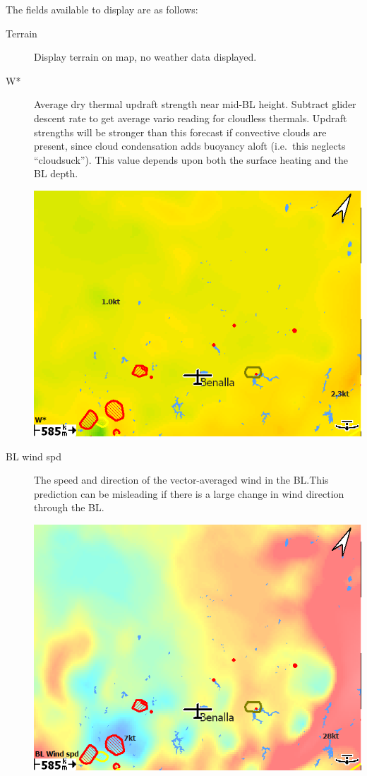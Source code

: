 The fields available to display are as follows:
\begin{description}
\item[Terrain] Display terrain on map, no weather data displayed.

\item[W*] 
Average dry thermal updraft strength near mid-BL height.  Subtract
glider descent rate to get average vario reading for cloudless
thermals.  Updraft strengths will be stronger than this forecast if
convective clouds are present, since cloud condensation adds buoyancy
aloft (i.e.\ this neglects ``cloudsuck'').  This value depends upon both
the surface heating and the BL depth.

\begin{center}
\includegraphics[angle=0,width=0.8\linewidth,keepaspectratio='true']{figures/rasp-wstar.png}
\end{center}

\item[BL wind spd] 
The speed and direction of the vector-averaged wind in the BL.\@  This
prediction can be misleading if there is a large change in wind
direction through the BL.\@

\begin{center}
\includegraphics[angle=0,width=0.8\linewidth,keepaspectratio='true']{figures/rasp-blwindspd.png}
\end{center}


\end{description}
